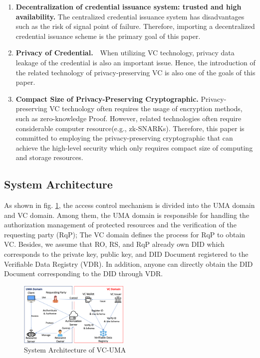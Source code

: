 \documentclass[conference, dvipdfmx]{IEEEtran} %
\begin{document}
\begin{sloppypar}
\begin{enumerate}
  \item \textbf{Decentralization of credential issuance system: trusted and high availability.} The centralized credential issuance system has disadvantages such as the risk of signal point of failure. Therefore, importing a decentralized credential issuance scheme is the primary goal of this paper.
  \item \textbf{Privacy of Credential.}　When utilizing VC technology, privacy data leakage of the credential is also an important issue. Hence, the introduction of the related technology of privacy-preserving VC is also one of the goals of this paper.
  \item \textbf{Compact Size of Privacy-Preserving Cryptographic.} Privacy-preserving VC technology often requires the usage of encryption methods, such as zero-knowledge Proof. However, related technologies often require considerable computer resource(e.g., zk-SNARKs). Therefore, this paper is committed to employing the privacy-preserving cryptographic that can achieve the high-level security which only requires compact size of computing and storage resources.
\end{enumerate}

\subsection{System Architecture}

As shown in fig. \ref{fig:system_architecture}, the access control mechanism is divided into the UMA domain and VC domain. Among them, the UMA domain is responsible for handling the authorization management of protected resources and the verification of the requesting party (RqP);
The VC domain defines the process for RqP to obtain VC. Besides, we assume that RO, RS, and RqP already own DID which corresponds to the private key, public key, and DID Document registered to the Verifiable Data Registry (VDR). In addition, anyone can directly obtain the DID Document corresponding to the DID through VDR.


\begin{figure}[htbp] %
  \begin{center} %
  \includegraphics[width=0.47\textwidth]{images/structure_vc_uma.png} %
  \caption{System Architecture of VC-UMA} %
  \label{fig:system_architecture} %
  \end{center}
\end{figure}


\end{sloppypar}
\end{document}
